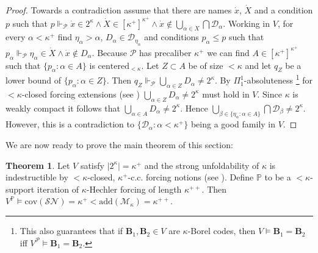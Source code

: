 \documentclass[12pt,a4paper]{scrartcl}
\theoremstyle{definition}
\newtheorem{theorem}[definition]{Theorem}
\numberwithin{equation}{section}
\begin{document}
\begin{proof}
Towards a contradiction assume that there are names $\dot{x}$, $\dot{X}$ and a condition $p$ such that $p \Vdash_{\mathcal{P}} \dot{x} \in 2^\kappa \land \dot{X} \in [\kappa^+]^{\kappa^+} \land \dot{x} \notin \bigcup_{\alpha \in \dot{X}} \bigcap \mathcal{D}_\alpha$.  Working in $V$, for every $\alpha < \kappa^+$ find $\eta_\alpha > \alpha$, $D_\alpha \in \mathcal{D}_{\eta_\alpha}$ and conditions $p_\alpha \leq p$ such that $p_\alpha \Vdash_{\mathcal{P}} \eta_\alpha \in \dot{X} \land \dot{x} \notin D_\alpha$. Because $\mathcal{P}$ has precaliber $\kappa^+$ we can find $A \in [\kappa^+]^{\kappa^+}$ such that $\{p_\alpha \colon \alpha \in A\}$ is $\text{centered}_{<\kappa}$. Let $Z \subset A$ be of size $<\kappa$ and let $q_Z$ be a lower bound of $\{p_\alpha \colon \alpha \in Z\}$. Then $q_Z \Vdash_{\mathcal{P}} \bigcup_{\alpha \in Z} D_\alpha \neq 2^\kappa$. By $\Pi_1^1$-absoluteness \footnote{This also guarantees that if $\mathbf{B}_1, \mathbf{B}_2 \in V$ are $\kappa$-Borel codes, then $V \vDash \mathbf{B}_1 =\mathbf{B}_2$ iff $V^{\mathcal{P}} \vDash \mathbf{B}_1 =\mathbf{B}_2$.} for ${<}\kappa$-closed forcing extensions (see \cite{Friedman}) $\bigcup_{\alpha \in Z} D_\alpha \neq 2^\kappa$ must hold in $V$. Since $\kappa$ is weakly compact it follows that $\bigcup_{\alpha \in A} D_\alpha \neq 2^\kappa$. Hence $\bigcup_{\beta \in \{ \eta_\alpha \colon \alpha \in A\}} \bigcap \mathcal{D}_\beta \neq 2^\kappa$. However, this is a contradiction to $\{\mathcal{D}_\alpha \colon \alpha < \kappa^+\}$ being a good family in $V$.
\end{proof}

We are now ready to prove the main theorem of this section:

\begin{theorem}
Let $V$ satisfy $\vert 2^\kappa\vert =\kappa^+$ and the strong unfoldability of $\kappa$ is indestructible by ${<}\kappa$-closed, $\kappa^+$-c.c. forcing notions (see \cite{Johnstone}). Define $\mathbb{P}$ to be a ${<}\kappa$-support iteration of $\kappa$-Hechler forcing of length $\kappa^{++}$. Then $V^{\mathbb{P}} \vDash \text{cov}(\mathcal{SN})= \kappa^+ <\text{add}(\mathcal{M}_\kappa)=\kappa^{++}$.
\end{theorem}
\end{document}
